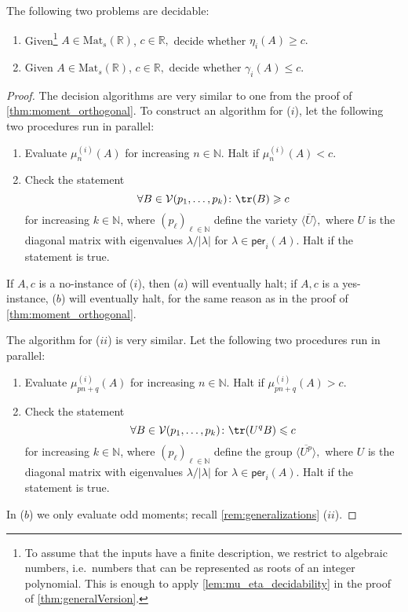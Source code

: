 \begin{lemma}\label{lem:mu_eta_decidability}
The following two problems are decidable:
\begin{enumerate}[label=$(\roman*)$]
	\item\label{prob1:lemma} Given\footnote{To assume that the inputs have a finite description, we restrict to algebraic numbers, i.e.\ numbers that can be represented as roots of an integer polynomial. This is enough to apply \cref{lem:mu_eta_decidability} in the proof of \cref{thm:generalVersion}.} $A \in \mathrm{Mat}_s(\mathbb{R})$, $c \in \mathbb{R},$ decide whether $\eta_i(A) \geqslant c.$
	\item\label{prob2:lemma} Given $A \in \mathrm{Mat}_s(\mathbb{R})$, $c \in \mathbb{R},$ decide whether $\gamma_i(A) \leqslant c.$
\end{enumerate}
\end{lemma}
\begin{proof}
The decision algorithms are very similar to one from the proof of \cref{thm:moment_orthogonal}. To construct an algorithm for ($i$), let the following two procedures run in parallel:
\begin{enumerate}[label=($\alph*$)]
	\item\label{alg1a} Evaluate $\mu_n^{(i)}(A)$ for increasing $n \in \mathbb{N}$. Halt if $\mu_n^{(i)}(A) < c$.
	\item\label{alg2a} Check the statement
	$$ \forall B \in \mathcal{V}(p_1, \ldots, p_k)\colon \tr(B) \geqslant c$$
	for increasing $k \in \mathbb{N}$, where $(p_\ell)_{\ell \in \mathbb{N}}$ define the variety $\overline{\langle U \rangle},$ where $U$ is the diagonal matrix with eigenvalues $\lambda/|\lambda|$ for $\lambda \in \mathsf{per}_i(A)$. Halt if the statement is true.
\end{enumerate}
If $A,c$ is a no-instance of ($i$), then ($a$) will eventually halt; if $A,c$ is a yes-instance, ($b$) will eventually halt, for the same reason as in the proof of \cref{thm:moment_orthogonal}.

The algorithm for ($ii$)  is very similar. Let the following two procedures run in parallel:
\begin{enumerate}[label=($\alph*$)]
	\item\label{alg1b} Evaluate $\mu_{pn+q}^{(i)}(A)$ for increasing $n \in \mathbb{N}$. Halt if $\mu_{pn+q}^{(i)}(A) > c$.
	\item\label{alg2b} Check  the statement
	$$ \forall B \in \mathcal{V}(p_1, \ldots, p_k)\colon \tr(U^qB) \leqslant c$$
	for increasing $k \in \mathbb{N}$, where $(p_\ell)_{\ell \in \mathbb{N}}$ define the group $\overline{\langle U^p \rangle},$ where $U$ is the diagonal matrix with eigenvalues $\lambda/|\lambda|$ for $\lambda \in \mathsf{per}_i(A)$. Halt if the statement is true.
\end{enumerate}
In ($b$) we only evaluate odd moments; recall  \cref{rem:generalizations} ($ii$). 
\end{proof}

